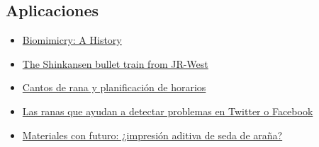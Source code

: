 \documentclass[twocolumn,amsmath,amssymb,aps,floatfix]{revtex4-2}
\begin{document}
\subsection{Aplicaciones}
\begin{itemize}
   \item \href{https://ehistory.osu.edu/exhibitions/biomimicry-history}{Biomimicry: A History}
   \item \href{https://asknature.org/innovation/high-speed-train-inspired-by-the-kingfisher/}{The Shinkansen bullet train from JR-West}
   \item \href{https://naukas.com/2016/11/28/cantos-de-rana-y-planificacion-de-horarios/}{Cantos de rana y planificación de horarios}
   \item \href{https://yorokobu.es/algoritmo-ranas/}{Las ranas que ayudan a detectar problemas en Twitter o Facebook}
   \item \href{https://faircompanies.com/articles/materiales-con-futuro-impresion-aditiva-de-seda-de-arana/}{Materiales con futuro: ¿impresión aditiva de seda de araña?}
\end{itemize}


\end{document}
